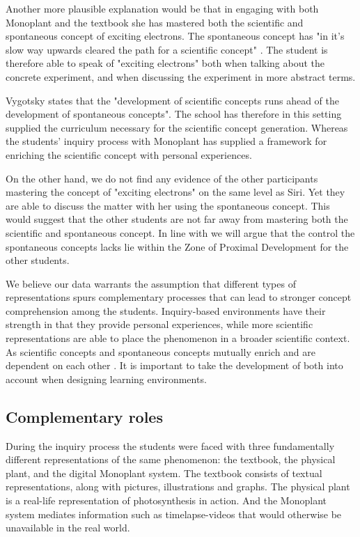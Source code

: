 Another more plausible explanation would be that in engaging with both Monoplant and the textbook she has mastered both the scientific and spontaneous concept of exciting electrons. The spontaneous concept has "in it's slow way upwards cleared the path for a scientific concept" \citep{vygotsky2012thought}. The student is therefore able to speak of "exciting electrons" both when talking about the concrete experiment, and when discussing the experiment in more abstract terms. 

Vygotsky states that the "development of scientific concepts runs ahead of the development of spontaneous concepts". The school has therefore in this setting supplied the curriculum necessary for the scientific concept generation. Whereas the students' inquiry process with Monoplant has supplied a framework for enriching the scientific concept with personal experiences.

On the other hand, we do not find any evidence of the other participants mastering the concept of "exciting electrons" on the same level as Siri. Yet they are able to discuss the matter with her using the spontaneous concept. This would suggest that the other students are not far away from mastering both the scientific and spontaneous concept. In line with \citet{vygotsky2012thought} we will argue that the control the spontaneous concepts lacks lie within the Zone of Proximal Development for the other students. 

We believe our data warrants the assumption that different types of representations spurs complementary processes that can lead to stronger concept comprehension among the students. Inquiry-based environments have their strength in that they provide personal experiences, while more scientific representations are able to place the phenomenon in a broader scientific context. As scientific concepts and spontaneous concepts mutually enrich and are dependent on each other \citep{vygotsky2012thought}. It is important to take the development of both into account when designing learning environments. 




\subsection{Complementary roles}
During the inquiry process the students were faced with three fundamentally different representations of the same phenomenon: the textbook, the physical plant, and the digital Monoplant system. The textbook consists of textual representations, along with pictures, illustrations and graphs. The physical plant is a real-life representation of photosynthesis in action. And the Monoplant system mediates information such as timelapse-videos that would otherwise be unavailable in the real world. 

